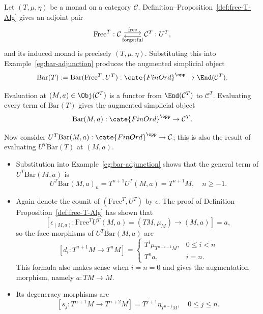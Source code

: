 \begin{example}\label{eg:bar-comonad}
	Let $(T,\mu,\eta)$ be a monad on a category $\mathcal{C}$.
	Definition--Proposition~\ref{def:free-T-Alg} gives an adjoint pair
	\[\begin{tikzcd}
		\mathrm{Free}^T : \mathcal{C} \arrow[shift left, r, "\text{free}"] & \mathcal{C}^T: U^T \arrow[shift left, l, "\text{forgetful}"] ,
	\end{tikzcd}\]
	and its induced monad is precisely $(T,\mu,\eta)$. Substituting this into
	Example~\ref{eg:bar-adjunction} produces the augmented simplicial object
	\[ \mathrm{Bar}(T) := \mathrm{Bar}(\mathrm{Free}^T, U^T): \cate{FinOrd}^{\opp} \to \End(\mathcal{C}^T). \]

	Evaluation at $(M,a)\in\Obj(\mathcal{C}^T)$ is a functor from
	$\End(\mathcal{C}^T)$ to $\mathcal{C}^T$. Evaluating every term of
	$\mathrm{Bar}(T)$ gives the augmented simplicial object
	\[ \mathrm{Bar}(M, a): \cate{FinOrd}^{\opp} \to \mathcal{C}^T .\]

	Now consider $U^T\mathrm{Bar}(M,a):\cate{FinOrd}^{\opp}\to
	\mathcal{C}$; this is also the result of evaluating
	$U^T\mathrm{Bar}(T)$ at $(M,a)$.
	\begin{itemize}
		\item Substitution into Example~\ref{eg:bar-adjunction} shows that the
		general term of $U^T\mathrm{Bar}(M,a)$ is
		\[ U^T \mathrm{Bar}(M, a)_n = T^{n+1} U^T (M, a) = T^{n+1} M, \quad n \geq -1. \]
		\item Again denote the counit of $(\mathrm{Free}^T,U^T)$ by
		$\epsilon$. The proof of Definition--Proposition~\ref{def:free-T-Alg}
		has shown that
		\[ \left[ \epsilon_{(M, a)} : \mathrm{Free}^T U^T (M, a) = (TM, \mu_M) \to (M, a) \right] = a, \]
		so the face morphisms of $U^T\mathrm{Bar}(M,a)$ are
		\begin{equation*}
			\left[ d_i: T^{n+1}M \to T^n M \right] = \begin{cases}
				T^i \mu_{T^{n-i-1} M}, & 0 \leq i < n \\
				T^n a, & i = n.
			\end{cases}
		\end{equation*}
		This formula also makes sense when $i=n=0$ and gives the augmentation
		morphism, namely $a:TM\to M$.
		\item Its degeneracy morphisms are
		\[ \left[ s_j: T^{n+1} M \to T^{n+2} M \right] =
		T^{j+1} \eta_{T^{n-j} M}, \quad 0 \leq j \leq n .\]
	\end{itemize}


\end{example}
